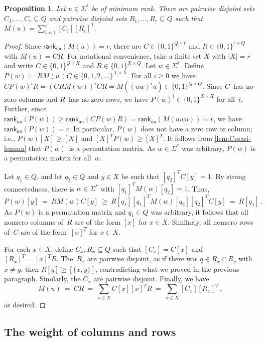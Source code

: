 \documentclass[11pt,a4paper]{amsart}
\newcommand{\rku}{\mathsf{rank}_{\mathsf{un}}}
\theoremstyle{plain}
\newtheorem{prop}[thm]{Proposition}
\theoremstyle{definition}
\theoremstyle{defC}
\theoremstyle{thmC}
\theoremstyle{plain}
\numberwithin{equation}{section}
\begin{document}
\begin{prop} \label{prop:Cesari-first}
Let $u \in \Sigma^*$ be of minimum rank.
There are pairwise disjoint sets $C_1, \ldots, C_r \subseteq Q$ and pairwise disjoint sets $R_1, \ldots, R_r \subseteq Q$ such that $M(u) = \sum_{i=1}^r [C_i] [R_i]^T$.
\end{prop}
\begin{proof}
Since $\rku(M(u)) = r$, there are $C \in \{0,1\}^{Q \times r}$ and $R \in \{0,1\}^{r \times Q}$ with $M(u) = C R$.
For notational convenience, take a finite set $X$ with $|X| = r$ and write $C \in \{0,1\}^{Q \times X}$ and $R \in \{0,1\}^{X \times Q}$.
Let $w \in \Sigma^*$.
Define $P(w) := R M(w) C \in \{0,1,2,\ldots\}^{X \times X}$.
For all $i \ge 0$ we have $C P(w)^i R = (C R M(w))^i C R = M((u w)^i u) \in \{0,1\}^{Q \times Q}$.
Since $C$~has no zero columns and $R$~has no zero rows, we have $P(w)^i \in \{0,1\}^{X \times X}$ for all~$i$.
Further, since $\rku(P(w)) \ge \rku(C P(w) R) = \rku(M(u w u)) = r$, we have $\rku(P(w)) = r$.
In particular, $P(w)$ does not have a zero row or column; i.e., $P(w) [X] \ge [X]$ and $[X]^T P(w) \ge [X]^T$. 
It follows from \autoref{lem:Cesari-lemma} that $P(w)$~is a permutation matrix.
As $w \in \Sigma^*$ was arbitrary, $P(w)$ is a permutation matrix for all~$w$.

Let $q_1 \in Q$, and let $q_2 \in Q$ and $y \in X$ be such that $[q_2]^T C [y] = 1$.
By strong connectedness, there is $w \in \Sigma^*$ with $[q_1]^T M(w) [q_2] = 1$.
Thus,
\[
P(w) [y] \ = \ R M(w) C [y] \ \ge \ R [q_1] [q_1]^T M(w) [q_2] [q_2]^T C [y] \ = \ R [q_1] \,.
\]
As $P(w)$ is a permutation matrix and $q_1 \in Q$ was arbitrary, it follows that all nonzero columns of~$R$ are of the form $[x]$ for $x \in X$.
Similarly, all nonzero rows of~$C$ are of the form~$[x]^T$ for $x \in X$.

For each $x \in X$, define $C_x, R_x \subseteq Q$ such that $[C_x] = C [x]$ and $[R_x]^T = [x]^T R$.
The~$R_x$ are pairwise disjoint, as if there was $q \in R_x \cap R_y$ with $x \ne y$, then $R [q] \ge [\{x,y\}]$, contradicting what we proved in the previous paragraph.
Similarly, the $C_x$ are pairwise disjoint.
Finally, we have
\[
 M(u) \ = \ C R \ = \ \sum_{x \in X} C [x] [x]^T R \ = \ \sum_{x \in X} [C_x] [R_x]^T\,,
\]
as desired.
\end{proof}


\subsection{The weight of columns and rows}\label{subsec:weights}
\end{document}
